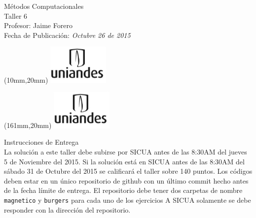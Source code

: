 \documentclass[11pt,letterpaper]{exam}
\begin{document}
\begin{center}
{\Large Métodos Computacionales} \\
Taller 6 \\
Profesor: Jaime Forero\\
Fecha de Publicación: {\small \it Octubre 26 de 2015}\\
\end{center}

\begin{textblock*}{40mm}(10mm,20mm)
  \includegraphics[width=3cm]{logoUniandes.png}
\end{textblock*}

\begin{textblock*}{40mm}(161mm,20mm)
  \includegraphics[width=3cm]{logoUniandes.png}
\end{textblock*}

\vspace{0.5cm}

{\Large Instrucciones de Entrega}\\

\noindent
La solución a este taller debe subirse por SICUA antes de las 8:30AM
del jueves 5 de Noviembre del 2015. 
\noindent
Si la soluci\'on est\'a en SICUA
antes de las 8:30AM del s\'abado 31 de Octubre del 2015 se calificar\'a
el taller sobre 140 puntos. 
\noindent
Los c\'odigos deben estar en un \'unico repositorio de github con un
\'ultimo commit hecho antes de la fecha l\'imite de entrega. El
repositorio debe tener dos carpetas de nombre \verb"magnetico" y
\verb"burgers" para cada uno de los ejercicios A SICUA
solamente se debe responder con la direcci\'on del repositorio.
\end{document}
